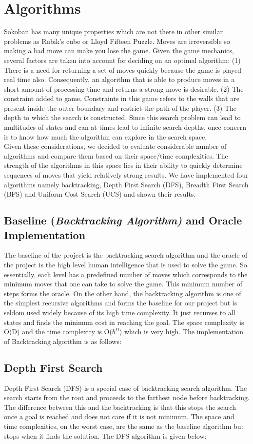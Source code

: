 \documentclass[10pt, final]{article}
\newcommand{\br}[1][.75]{\ \\[#1\baselineskip]}
\begin{document}
\section{Algorithms}
Sokoban has many unique properties which are not there in other similar problems as Rubik’s cube or Lloyd Fifteen Puzzle. Moves are irreversible so making a bad move can make you lose the game. Given the game mechanics, several factors are taken into account for deciding on an optimal algorithm:
(1) There is a need for returning a set of moves quickly because the game is played real time also. Consequently, an algorithm that is able to produce moves in a short amount of processing time and returns a strong move is desirable.
(2) The constraint added to game. Constraints in this game refers to the walls that are present inside the outer boundary and restrict the path of the player.
(3) The depth to which the search is constructed. Since this search problem can lead to multitudes of states and can at times lead to infinite search depths, once concern is to know how much the algorithm can explore in the search space. \br
Given these considerations, we decided to evaluate considerable number of algorithms and compare them based on their space/time complexities. The strength of the algorithms in this space lies in their ability to quickly determine sequences of moves that yield relatively strong results. We have implemented four algorithms namely backtracking, Depth First Search (DFS), Breadth First Search (BFS) and Uniform Cost Search (UCS) and shown their results.
\subsection{Baseline (\textit{Backtracking Algorithm)} and Oracle Implementation}
The baseline of the project is the backtracking search algorithm and the oracle of the project is the high level human intelligence that is used to solve the game. So essentially, each level has a predefined number of moves which corresponds to the minimum moves that one can take to solve the game. This minimum number of steps forms the oracle. On the other hand, the backtracking algorithm is one of the simplest recursive algorithms and forms the baseline for our project but is seldom used widely because of its high time complexity. It just recurses to all states and finds the minimum cost in reaching the goal. The space complexity is O(D) and the time complexity is O($b^D$) which is very high. The implementation of Backtracking algorithm is as follows:
\subsection{Depth First Search}
Depth First Search (DFS) is a special case of backtracking search algorithm. The search starts from the root and proceeds to the farthest node before backtracking. The difference between this and the backtracking is that this stops the search once a goal is reached and does not care if it is not minimum. The space and time complexities, on the worst case, are the same as the baseline algorithm but stops when it finds the solution. The DFS algorithm is given below:
\end{document}
